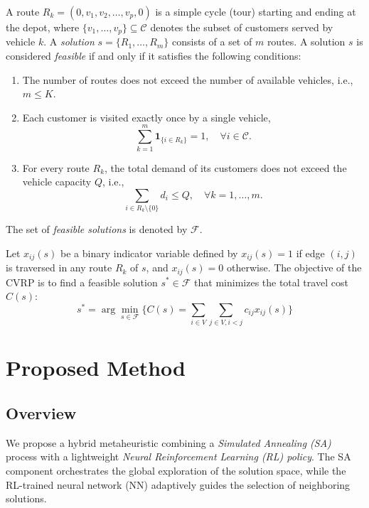 \documentclass[letterpaper]{article} %
\begin{document}
A route $R_k = (0, v_1, v_2, \ldots, v_p, 0)$ is a simple cycle (tour) starting and ending at the depot, where $\{v_1, \ldots, v_p\} \subseteq \mathcal{C}$ denotes the subset of customers served by vehicle $k$. A \textit{solution} $s = \{R_1, \ldots, R_m\}$ consists of a set of $m$ routes. A solution $s$ is considered \textit{feasible} if and only if it satisfies the following conditions:
\begin{enumerate}
    \item The number of routes does not exceed the number of available vehicles, i.e., $m \leq K$.
    \item Each customer is visited exactly once by a single vehicle,
    $$
    \sum_{k=1}^{m} \mathbf{1}_{\{i \in R_k\}} = 1, \quad \forall i \in \mathcal{C} .
    $$

    \item For every route $R_k$, the total demand of its customers does not exceed the vehicle capacity $Q$, i.e.,
    $$
    \sum_{i \in R_k \setminus \{0\}} d_i \leq Q, \quad \forall k = 1, \ldots, m.
    $$
\end{enumerate}
The set of \textit{feasible solutions} is denoted by $\mathcal{F}$.

Let $x_{ij}(s)$ be a binary indicator variable defined by $x_{ij}(s) = 1$ if edge $(i,j)$ is traversed in any route $R_k$ of $s$, and $x_{ij}(s) = 0$ otherwise. The objective of the CVRP is to find a feasible solution $s^* \in \mathcal{F}$ that minimizes the total travel cost $C(s)$:
$$
s^* = \arg\min_{s \in \mathcal{F}} \Big\{ C(s) = \sum_{i \in V} \sum_{j \in V, i < j} c_{ij} x_{ij}(s) \Big\}
$$



\section{Proposed Method}


\subsection{Overview}


We propose a hybrid metaheuristic combining a \textit{Simulated Annealing (SA)} process with a lightweight \textit{Neural Reinforcement Learning (RL) policy}. The SA component orchestrates the global exploration of the solution space, while the RL-trained neural network (NN) adaptively guides the selection of neighboring solutions.
\end{document}
